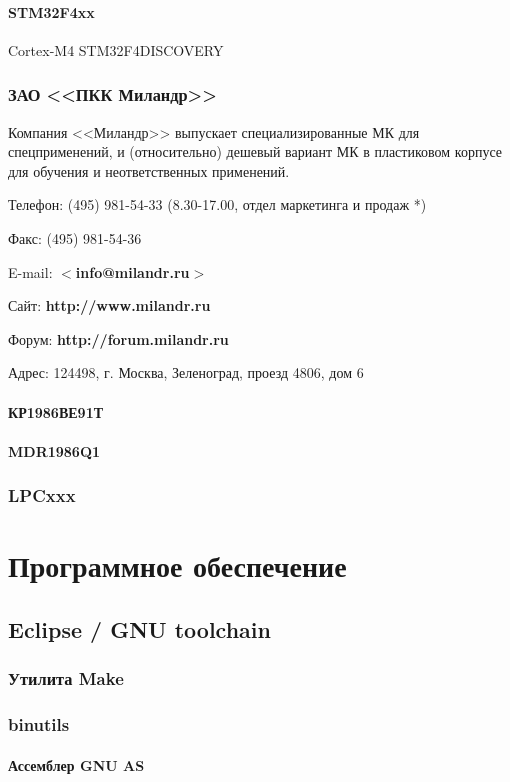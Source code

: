 \documentclass[oneside]{book}
\newcommand{\cm}[1]{Cortex-M#1}
\newcommand{\url}[1]{\textbf{#1}}
\newcommand{\email}[1]{$<$\textbf{#1}$>$}
\begin{document}
\subsection{STM32F4xx} \cm{4} STM32F4DISCOVERY
\section{ЗАО <<ПКК Миландр>>}

Компания <<Миландр>> выпускает специализированные МК для спецприменений,
и (относительно) дешевый вариант МК в пластиковом корпусе для обучения
и неответственных применений.

\bigskip

Телефон: (495) 981-54-33 (8.30-17.00, отдел маркетинга и продаж *)

Факс: (495) 981-54-36

E-mail: \email{info@milandr.ru}

Сайт: \url{http://www.milandr.ru}

Форум: \url{http://forum.milandr.ru}

Адрес: 124498, г. Москва, Зеленоград, проезд 4806, дом 6

\subsection{КР1986ВЕ91Т}
\subsection{MDR1986Q1}
\section{LPCxxx}

\part{Программное обеспечение}
\chapter{Eclipse / GNU toolchain}
\section{Утилита Make}
\section{binutils}
\subsection{Ассемблер GNU AS}
\end{document}
